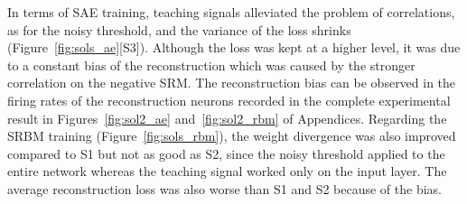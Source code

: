 In terms of SAE training, teaching signals alleviated the problem of correlations, as for the noisy threshold, and the variance of the loss shrinks (Figure~\ref{fig:sols_ae}[S3]).
Although the loss was kept at a higher level, it was due to a constant bias of the reconstruction which was caused by the stronger correlation on the negative SRM.
The reconstruction bias can be observed in the firing rates of the reconstruction neurons recorded in the complete experimental result in Figures~\ref{fig:sol2_ae} and~\ref{fig:sol2_rbm} of Appendices.
Regarding the SRBM training (Figure~\ref{fig:sols_rbm}), the weight divergence was also improved compared to S1 but not as good as S2, since the noisy threshold applied to the entire network whereas the teaching signal worked only on the input layer.
The average reconstruction loss was also worse than S1 and S2 because of the bias. 

